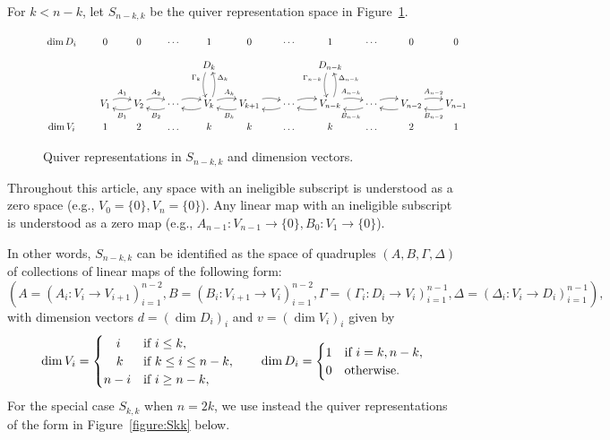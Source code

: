 \documentclass[11pt,reqno]{amsart}
\numberwithin{equation}{section}
\theoremstyle{definition}
\newcommand{\tif}{\textup{if }}
\begin{document}
For $k < n-k$, let $S_{n-k,k}$ be the quiver representation space in Figure~\ref{figure:Sn-kk}.
\begin{figure}[ht!]
\caption{Quiver representations in $S_{n-k,k}$ and dimension vectors.}
 \label{figure:Sn-kk}
\[ 
\xymatrix@C=18pt@R=9pt{
\dim D_i&0&0&\cdots &1&0&\cdots &1&\cdots &0&0
\\
&
& &  &   
\ar@/_/[dd]_<(0.2){\Gamma_k}
D_k
& &  &  
\ar@/_/[dd]_<(0.2){\Gamma_{n-k}}
D_{n-k}
 & & &&
\\ & & & & & & &  && 
\\ 
&%
{V_1}  
	\ar@/^/[r]^{A_1} 
	& 
	\ar@/^/[l]^{B_1}
{V_2}
	\ar@/^/[r]^{A_2}
	&
	\ar@/^/[l]^{B_2}
	\cdots   
	\ar@/^/[r]%
	& 
	\ar@/^/[l]%
{V_k}  
	\ar@/_/[uu]_>(0.8){\Delta_k} 
	\ar@/^/[r]^{A_{k}}
	&   
{V_{k+1}}  
	\ar@/^/[l]^{B_k}
	\ar@/^/[r]%
	&
	\ar@/^/[l]%
	\cdots
	\ar@/^/[r]%
	&  
{V_{n-k}} 
	\ar@/_/[uu]_>(0.8){\Delta_{n-k}}
	\ar@/^/[r]^{A_{n-k}}
	\ar@/^/[l]%
	& 
	\ar@/^/[l]^{B_{n-k}}
	\cdots
	\ar@/^/[r]%
	&
	\ar@/^/[l]%
{V_{n-2}}  
	\ar@/^/[r]^{A_{n-2}}
	& 
{V_{n-1}} 
\ar@/^/[l]^{B_{n-2}}  
\\
\dim V_i & 1&2&\ldots&k&k&\ldots&k&\ldots&2&1
}
\] 
\end{figure}
\rmk\label{rmk:0}
Throughout this article, any space with an ineligible subscript is understood as a zero space (e.g., $V_0 = \{0\}, V_{n} =\{0\}$). Any linear map with an ineligible subscript is understood as a zero map (e.g., $A_{n-1}:V_{n-1}\to \{0\}, B_0:V_1 \to \{0\}$).
\endrmk

In other words, $S_{n-k,k}$ can be identified as the space of quadruples $(A,B,\Gamma, \Delta)$ of collections of linear maps  of the following form:
\[
\left(A = (A_i:V_i\to V_{i+1})_{i=1}^{n-2}, B= (B_i:V_{i+1}\to V_i)_{i=1}^{n-2}, \Gamma = (\Gamma_i:D_i\to V_i)_{i=1}^{n-1}, \Delta = (\Delta_i:V_i\to D_i)_{i=1}^{n-1}\right),
\] 
with dimension vectors $d = (\dim D_i)_i$ and $v = (\dim V_i)_i$ given by
\[
\dim V_i = \begin{cases}
\quad i &\tif i \leq k, \\
\quad k &\tif k\leq i \leq n-k, \\
n-i &\tif i \geq n-k,
\end{cases}
\qquad
\dim D_i = \begin{cases}
1 &\tif i=k, n-k, \\
0 &\textup{otherwise}.
\end{cases}  
\]
For the special case $S_{k,k}$ when $n =2k$, we use instead the quiver representations of the form in Figure~\ref{figure:Skk} below.
\end{document}
